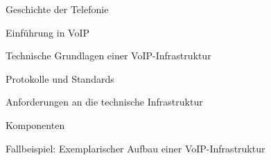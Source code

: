 \label{Grundlagen von VoIP}

 \label{Geschichte der Telefonie}
 \begin{section}{Geschichte der Telefonie}
 \end{section}
 
 \label{Einführung in VoIP}
 \begin{section}{Einführung in VoIP}
 \end{section}
 
 \label{Technische Grundlagen einer VoIP-Infrastruktur}
 \begin{section}{Technische Grundlagen einer VoIP-Infrastruktur}

 \label{Protokolle und Standards}
 \begin{subsection}{Protokolle und Standards}
 \end{subsection}
 
 \label{Anforderungen an die technische Infrastruktur}
 \begin{subsection}{Anforderungen an die technische Infrastruktur}
 \end{subsection}
 
 \label{Komponenten}
 \begin{subsection}{Komponenten}
 \end{subsection}
 
 \end{section}
 
 \label{Fallbeispiel: Exemplarischer Aufbau einer VoIP-Infrastruktur}
 \begin{section}{Fallbeispiel: Exemplarischer Aufbau einer VoIP-Infrastruktur}
 \end{section}
 
